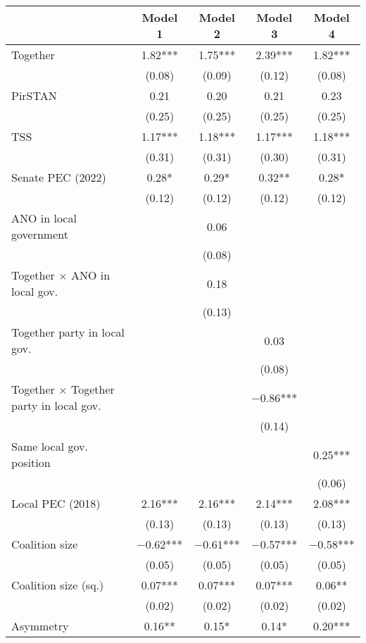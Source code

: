 \begin{table}
\centering
\begin{tabular}[t]{lcccc}
\toprule
  & Model 1 & Model 2 & Model 3 & Model 4\\
\midrule
Together & \num{1.82}*** & \num{1.75}*** & \num{2.39}*** & \num{1.82}***\\
 & (\num{0.08}) & (\num{0.09}) & (\num{0.12}) & (\num{0.08})\\
PirSTAN & \num{0.21} & \num{0.20} & \num{0.21} & \num{0.23}\\
 & (\num{0.25}) & (\num{0.25}) & (\num{0.25}) & (\num{0.25})\\
TSS & \num{1.17}*** & \num{1.18}*** & \num{1.17}*** & \num{1.18}***\\
 & (\num{0.31}) & (\num{0.31}) & (\num{0.30}) & (\num{0.31})\\
Senate PEC (2022) & \num{0.28}* & \num{0.29}* & \num{0.32}** & \num{0.28}*\\
 & (\num{0.12}) & (\num{0.12}) & (\num{0.12}) & (\num{0.12})\\
ANO in local government &  & \num{0.06} &  & \\
 &  & (\num{0.08}) &  & \\
Together × ANO in local gov. &  & \num{0.18} &  & \\
 &  & (\num{0.13}) &  & \\
Together party in local gov. &  &  & \num{0.03} & \\
 &  &  & (\num{0.08}) & \\
Together × Together party in local gov. &  &  & \num{-0.86}*** & \\
 &  &  & (\num{0.14}) & \\
Same local gov. position &  &  &  & \num{0.25}***\\
 &  &  &  & (\num{0.06})\\
Local PEC (2018) & \num{2.16}*** & \num{2.16}*** & \num{2.14}*** & \num{2.08}***\\
 & (\num{0.13}) & (\num{0.13}) & (\num{0.13}) & (\num{0.13})\\
Coalition size & \num{-0.62}*** & \num{-0.61}*** & \num{-0.57}*** & \num{-0.58}***\\
 & (\num{0.05}) & (\num{0.05}) & (\num{0.05}) & (\num{0.05})\\
Coalition size (sq.) & \num{0.07}*** & \num{0.07}*** & \num{0.07}*** & \num{0.06}**\\
 & (\num{0.02}) & (\num{0.02}) & (\num{0.02}) & \vphantom{1} (\num{0.02})\\
Asymmetry & \num{0.16}** & \num{0.15}* & \num{0.14}* & \num{0.20}***\\

\end{tabular}
\end{table}
